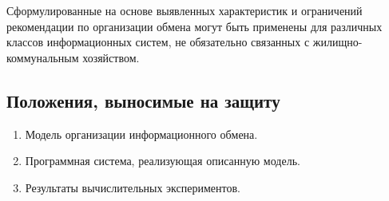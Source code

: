 Сформулированные на основе выявленных характеристик и ограничений рекомендации по организации обмена могут быть применены для различных классов информационных систем, не обязательно связанных с жилищно-коммунальным хозяйством.

\subsection*{Положения, выносимые на защиту}

\begin{enumerate}
	\item Модель организации информационного обмена.
	\item Программная система, реализующая описанную модель.
	\item Результаты вычислительных экспериментов.
\end{enumerate}

\clearpage
\newpage